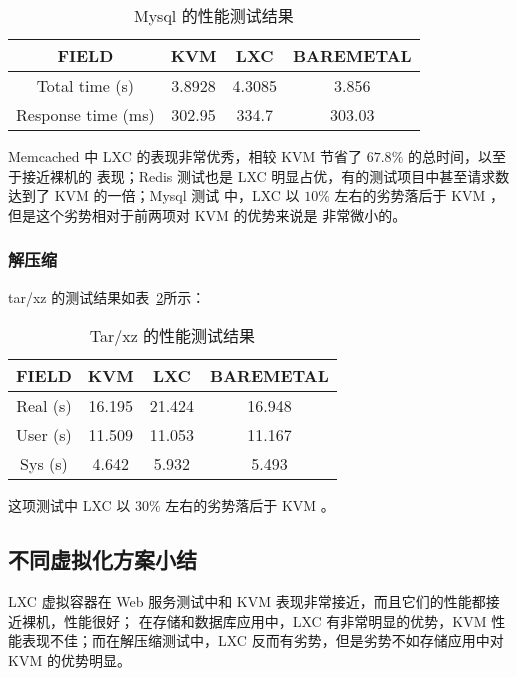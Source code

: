 \begin{table}[H]
    \centering
    \caption{Mysql 的性能测试结果}
    \begin{tabular}{||c c c c||}
        \hline
        FIELD & KVM & LXC & BAREMETAL \\
        \hline
        \hline
        Total time (s) & 3.8928 & 4.3085 & 3.856 \\
        \hline
        Response time (ms) & 302.95 & 334.7 & 303.03 \\
        \hline
    \end{tabular}
    \label{tab:mysql-perf}
\end{table}

Memcached 中 LXC 的表现非常优秀，相较 KVM 节省了 $67.8\%$ 的总时间，以至于接近裸机的
表现；Redis 测试也是 LXC 明显占优，有的测试项目中甚至请求数达到了 KVM 的一倍；Mysql 测试
中，LXC 以 $10\%$ 左右的劣势落后于 KVM ，但是这个劣势相对于前两项对 KVM 的优势来说是
非常微小的。

\subsubsection{解压缩}

tar/xz 的测试结果如表~\ref{tab:tar-xz-perf}所示：

\begin{table}[H]
    \centering
    \caption{Tar/xz 的性能测试结果}
    \begin{tabular}{||c c c c||}
        \hline
        FIELD & KVM & LXC & BAREMETAL \\
        \hline
        \hline
        Real (s) & 16.195 & 21.424 & 16.948 \\
        \hline
        User (s) & 11.509 & 11.053 & 11.167 \\
        \hline
        Sys (s) & 4.642 & 5.932 & 5.493 \\
        \hline
    \end{tabular}
    \label{tab:tar-xz-perf}
\end{table}

这项测试中 LXC 以 $30\%$ 左右的劣势落后于 KVM 。

\subsection{不同虚拟化方案小结}

LXC 虚拟容器在 Web 服务测试中和 KVM 表现非常接近，而且它们的性能都接近裸机，性能很好；
在存储和数据库应用中，LXC 有非常明显的优势，KVM 性能表现不佳；而在解压缩测试中，LXC
反而有劣势，但是劣势不如存储应用中对 KVM 的优势明显。

